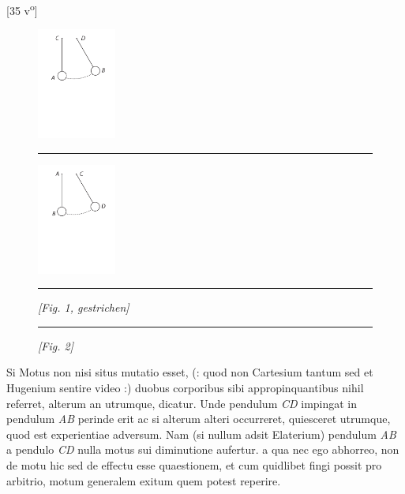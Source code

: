\vspace*{8mm}
\pstart 
\normalsize
[35 v\textsuperscript{o}] \pend \pstart
\begin{figure}  
\includegraphics[width=0.23\textwidth] {images/lh0351303_035r-d1.pdf}\rule[0cm]{13mm}{0cm}\includegraphics[width=0.23\textwidth] {images/lh0351303_035r-d2.pdf}\\
\rule[0cm]{1mm}{0cm}\textit{[Fig. 1, gestrichen]} \rule[0cm]{20mm}{0cm}\textit{[Fig. 2]}
\end{figure} Si Motus non nisi situs mutatio esset, (: quod non Cartesium\protect{} tantum sed et Hugenium\protect{} sentire video :) duobus corporibus sibi appropinquantibus nihil referret, alterum an utrumque,  dicatur. Unde pendulum \textit{CD} impingat in pendulum \textit{AB} perinde erit ac si alterum alteri occurreret,  quiesceret utrumque, quod est experientiae adversum. Nam (si nullum adsit Elaterium) pendulum \textit{AB} a pendulo \textit{CD} nulla motus sui diminutione aufertur.  a qua nec ego abhorreo, non de motu hic sed de effectu esse quaestionem, et cum quidlibet fingi possit pro arbitrio, motum generalem exitum quem potest reperire. \\
